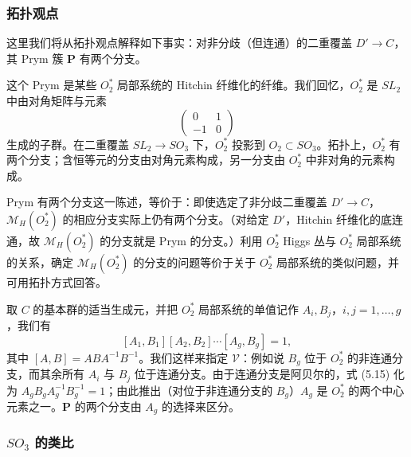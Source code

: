 \documentclass[11pt,a4paper]{article}
\begin{document}
\subsubsection{拓扑观点}

这里我们将从拓扑观点解释如下事实：对非分歧（但连通）的二重覆盖 $D'\to C$，其 Prym 簇 $\boldsymbol{P}$ 有两个分支。

这个 Prym 是某些 $O_2^*$ 局部系统的 Hitchin 纤维化的纤维。我们回忆，$O_2^*$ 是 $SL_2$ 中由对角矩阵与元素
\begin{equation}\tag{5.14}
\begin{pmatrix}
0 & 1\\
-1 & 0
\end{pmatrix}
\end{equation}
生成的子群。在二重覆盖 $SL_2\to SO_3$ 下，$O_2^*$ 投影到 $O_2\subset SO_3$。拓扑上，$O_2^*$ 有两个分支；含恒等元的分支由对角元素构成，另一分支由 $O_2^*$ 中非对角的元素构成。

Prym 有两个分支这一陈述，等价于：即使选定了非分歧二重覆盖 $D'\to C$，$\mathcal{M}_H(O_2^*)$ 的相应分支实际上仍有两个分支。（对给定 $D'$，Hitchin 纤维化的底连通，故 $\mathcal{M}_H(O_2^*)$ 的分支就是 Prym 的分支。）利用 $O_2^*$ Higgs 丛与 $O_2^*$ 局部系统的关系，确定 $\mathcal{M}_H(O_2^*)$ 的分支的问题等价于关于 $O_2^*$ 局部系统的类似问题，并可用拓扑方式回答。

取 $C$ 的基本群的适当生成元，并把 $O_2^*$ 局部系统的单值记作 $A_i,B_j$，$i,j=1,\dots,g$，我们有
\begin{equation}\tag{5.15}
[A_1,B_1][A_2,B_2]\cdots[A_g,B_g] = 1,
\end{equation}
其中 $[A,B] = ABA^{-1}B^{-1}$。我们这样来指定 $\mathcal{V}$：例如说 $B_g$ 位于 $O_2^*$ 的非连通分支，而其余所有 $A_i$ 与 $B_j$ 位于连通分支。由于连通分支是阿贝尔的，式 (5.15) 化为 $A_g B_g A_g^{-1}B_g^{-1} = 1$；由此推出（对位于非连通分支的 $B_g$）$A_g$ 是 $O_2^*$ 的两个中心元素之一。$\boldsymbol{P}$ 的两个分支由 $A_g$ 的选择来区分。


\subsubsection{\texorpdfstring{$SO_3$}{SO3} 的类比}
\end{document}

